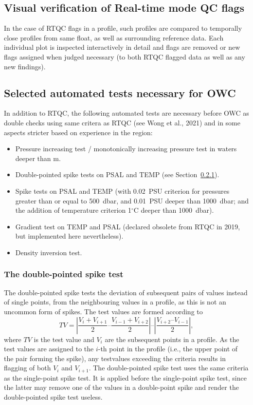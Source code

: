 \documentclass{article}
\begin{document}
\newpage
\subsection{Visual verification of Real-time mode QC flags}
In the case of RTQC flags in a profile, such profiles are compared to
temporally close profiles from same float, as well as surrounding
reference data. Each individual plot is inspected interactively in detail
and flags are removed or new flags assigned when judged necessary (to both
RTQC flagged data as well as any new findings).
%
 

\subsection{Selected automated tests necessary for OWC}
In addition to RTQC, the following automated tests are necessary before 
OWC as double checks using same critera as RTQC (see Wong et al., 2021)
and in some aspects stricter based on experience in the region:
\begin{itemize}
\item Pressure increasing test / monotonically increasing pressure test in
  waters deeper than m.
\item Double-pointed spike tests on PSAL and TEMP (see Section~\ref{sec:double-pointed-spike-test}).
\item Spike tests on PSAL and TEMP (with 0.02~PSU criterion for pressures
  greater than or equal to 500~dbar, and 0.01~PSU deeper than 1000~dbar;
  and the addition of temperature criterion 1$^\circ$C deeper than 1000~dbar).
\item Gradient test on TEMP and PSAL (declared obsolete from RTQC in 2019,
  but implemented here nevertheless).
\item Density inversion test.
\end{itemize}

\subsubsection{The double-pointed spike test}\label{sec:double-pointed-spike-test}
The double-pointed spike tests the deviation of subsequent pairs of values
instead of single points, from the neighbouring values in a profile, as
this is not an uncommon form of spikes. The test values are formed
according to 
\begin{equation}
  \label{eq:1}
  TV = \left|\frac{V_{i} + V_{i+1}}{2} – \frac{V_{i-1} + V_{i+2}}{2}\right|  – \left|\frac{V_{i+2} – V_{i-1}}{2}\right| ,
\end{equation}
where $TV$ is the test value and $V_i$ are the subsequent points in a
profile. As the test values are assigned to the $i$-th point in the
profile (i.e., the upper point of the pair forming the spike), any testvalues
exceeding the criteria results in flagging of both $V_i$ and $V_{i+1}$.
%
The double-pointed spike test uses the same criteria as the single-point spike test.
It is applied before the single-point spike test, since the latter may remove
one of the values in a double-point spike and render the double-pointed spike
test useless.
\end{document}
